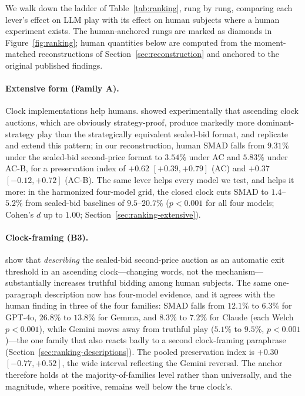 We walk down the ladder of Table~\ref{tab:ranking}, rung by rung, comparing each lever's effect on LLM play with its effect on human subjects where a human experiment exists. The human-anchored rungs are marked as diamonds in Figure~\ref{fig:ranking}; human quantities below are computed from the moment-matched reconstructions of Section~\ref{sec:reconstruction} and anchored to the original published findings.

\paragraph{Extensive form (Family A).} Clock implementations help humans. \citet{li2017obviously} showed experimentally that ascending clock auctions, which are obviously strategy-proof, produce markedly more dominant-strategy play than the strategically equivalent sealed-bid format, and \citet{breitmoser2022obviousness} replicate and extend this pattern; in our reconstruction, human SMAD falls from $9.31\%$ under the sealed-bid second-price format to $3.54\%$ under AC and $5.83\%$ under AC-B, for a preservation index of $+0.62$ $[+0.39,+0.79]$ (AC) and $+0.37$ $[-0.12,+0.72]$ (AC-B). The same lever helps every model we test, and helps it more: in the harmonized four-model grid, the closed clock cuts SMAD to $1.4$--$5.2\%$ from sealed-bid baselines of $9.5$--$20.7\%$ ($p<0.001$ for all four models; Cohen's $d$ up to $1.00$; Section~\ref{sec:ranking-extensive}).

\paragraph{Clock-framing (B3).} \citet{breitmoser2022obviousness} show that \emph{describing} the sealed-bid second-price auction as an automatic exit threshold in an ascending clock---changing words, not the mechanism---substantially increases truthful bidding among human subjects. The same one-paragraph description now has four-model evidence, and it agrees with the human finding in three of the four families: SMAD falls from $12.1\%$ to $6.3\%$ for GPT-4o, $26.8\%$ to $13.8\%$ for Gemma, and $8.3\%$ to $7.2\%$ for Claude (each Welch $p<0.001$), while Gemini moves away from truthful play ($5.1\%$ to $9.5\%$, $p<0.001$)---the one family that also reacts badly to a second clock-framing paraphrase (Section~\ref{sec:ranking-descriptions}). The pooled preservation index is $+0.30$ $[-0.77,+0.52]$, the wide interval reflecting the Gemini reversal. The anchor therefore holds at the majority-of-families level rather than universally, and the magnitude, where positive, remains well below the true clock's.

